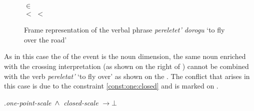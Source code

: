 \begin{figure}
\begin{minipage}{0.66\textwidth}
\end{minipage}%
\begin{minipage}{0.33\textwidth}\centering
{}\\
 $\in$ \\ $<$  $<$ 
\end{minipage}
\caption{Frame representation of the verbal phrase \textit{pereletet' dorogu} `to fly over the road' \label{frame:pere:letet:road}}
\end{figure}

As in this case the  of the event is the noun dimension, the same noun enriched with the crossing interpretation (as shown on the right of ) cannot be combined with the verb \textit{pereletat'} `to fly over' as shown on the . The conflict that arises in this case is due to the constraint \ref{const:one:closed} and is marked on .

\ex.\label{const:one:closed}\textit{one-point-scale} $\,\wedge\,$ \textit{closed-scale} $\rightarrow \bot$

